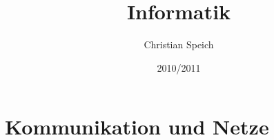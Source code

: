\documentclass[
			bigheadings,
			ngerman,
			a4paper,
			BCOR5mm,
			DIV11,
			1.1headlines,
			headexclude,
			footerexclude,
			mpeclude,
			pagesize,
			twoside,
			onecolumn,
			openright,
			titelpage,
			parindent,
			nochapterprefix,
			bibtotoc,
			listsindent,
			pointlessnumbers,
			fleqn]{scrbook}
\title{Informatik}
\author{Christian Speich}
\date{2010/2011}                                           %
\begin{document}
\maketitle
\tableofcontents

\part{Kommunikation und Netze}



\end{document}
